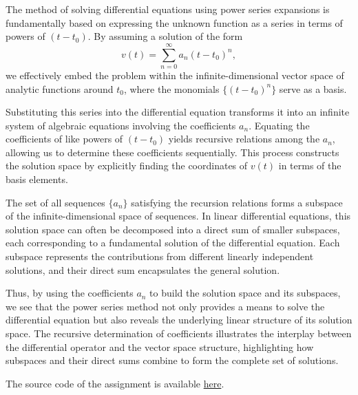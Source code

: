 \documentclass[12pt,a4paper]{article}
\begin{document}
\begin{remark}
The method of solving differential equations using power series expansions is fundamentally based on expressing the unknown function as a series in terms of powers of \( (t - t_0) \). By assuming a solution of the form
\[
v(t) = \sum_{n=0}^\infty a_n (t - t_0)^n,
\]
we effectively embed the problem within the infinite-dimensional vector space of analytic functions around \( t_0 \), where the monomials \( \{ (t - t_0)^n \} \) serve as a basis.

Substituting this series into the differential equation transforms it into an infinite system of algebraic equations involving the coefficients \( a_n \). Equating the coefficients of like powers of \( (t - t_0) \) yields recursive relations among the \( a_n \), allowing us to determine these coefficients sequentially. This process constructs the solution space by explicitly finding the coordinates of \( v(t) \) in terms of the basis elements.

The set of all sequences \( \{ a_n \} \) satisfying the recursion relations forms a subspace of the infinite-dimensional space of sequences. In linear differential equations, this solution space can often be decomposed into a direct sum of smaller subspaces, each corresponding to a fundamental solution of the differential equation. Each subspace represents the contributions from different linearly independent solutions, and their direct sum encapsulates the general solution.

Thus, by using the coefficients \( a_n \) to build the solution space and its subspaces, we see that the power series method not only provides a means to solve the differential equation but also reveals the underlying linear structure of its solution space. The recursive determination of coefficients illustrates the interplay between the differential operator and the vector space structure, highlighting how subspaces and their direct sums combine to form the complete set of solutions.

\end{remark}

The source code of the assignment is available \href{https://www.overleaf.com/read/xfncwbffbqks#5bc191}{here}.
\end{document}
